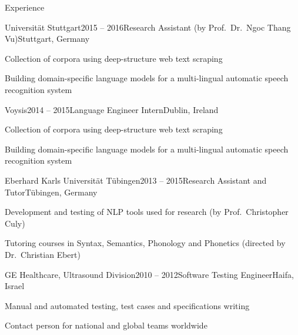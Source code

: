 \documentclass{resume} %
\begin{document}
\begin{rSection}{Experience}

\begin{rSubsection}{Universität Stuttgart}{2015 -- 2016}{Research Assistant (by Prof.\ Dr.\ Ngoc Thang Vu)}{Stuttgart, Germany}
	\setlength{\itemindent}{.7cm}
	
	\item Collection of corpora using deep-structure web text scraping
	
	\item Building domain-specific language models for a multi-lingual automatic speech recognition system 
\end{rSubsection}

\begin{rSubsection}{Voysis}{2014 -- 2015}{Language Engineer Intern}{Dublin, Ireland}
	\setlength{\itemindent}{.7cm}
	
	\item Collection of corpora using deep-structure web text scraping
	
	\item Building domain-specific language models for a multi-lingual automatic speech recognition system 
\end{rSubsection}

\begin{rSubsection}{Eberhard Karls Universität Tübingen}{2013 -- 2015}{Research Assistant and Tutor}{Tübingen, Germany}
	\setlength{\itemindent}{.7cm}
	
	\item Development and testing of NLP tools used for research (by Prof.\ Christopher Culy)
	
	\item Tutoring courses in Syntax, Semantics, Phonology and Phonetics (directed by Dr.\ Christian Ebert)
\end{rSubsection}

\begin{rSubsection}{GE Healthcare, Ultrasound Division}{2010 -- 2012}{Software Testing Engineer}{Haifa, Israel}
	\setlength{\itemindent}{.7cm}
	
	\item Manual and automated testing, test cases and specifications writing
	
	\item Contact person for national and global teams worldwide 
\end{rSubsection}


\end{rSection}
\end{document}
